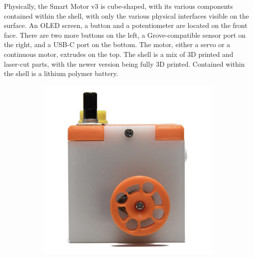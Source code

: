 Physically, the Smart Motor v3 is cube-shaped, with its various components contained within the shell, with only the various physical interfaces visible on the surface. 
An OLED screen, a button and a potentiometer are located on the front face. There are two more buttons on the left, a Grove-compatible sensor port on the right, and a USB-C port on the bottom. The motor, either a servo or a continuous motor, extrudes on the top. The shell is a mix of 3D printed and laser-cut parts, with the newer version being fully 3D printed. Contained within the shell is a lithium polymer battery.

\begin{figure}[H]
    \centering
    \begin{subfigure}[b]{0.25\textwidth}
        \includegraphics[width=\linewidth]{overleaf/images/sm_top.jpg}
    \end{subfigure}
    \begin{subfigure}[b]{0.25\textwidth}

\end{subfigure}
\end{figure}

